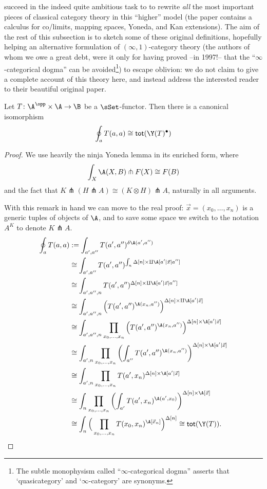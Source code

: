 \cite{cordier1997homotopy} succeed in the indeed quite ambitious task to to rewrite \emph{all} the most important pieces of classical category theory in this ``higher'' model (the paper contains a calculus for co/limits, mapping spaces, Yoneda, and Kan extensions). The aim of the rest of this subsection is to sketch some of these original definitions, hopefully helping an alternative formulation of $(\infty,1)$-category theory (the authors of whom we owe a great debt, were it only for having proved --in 1997!-- that the ``$\infty$-categorical dogma'' can be avoided\footnote{The subtle monophysism called ``$\infty$-categorical dogma'' asserts that `quasicategory' and `$\infty$\hyp{}category' are synonyms.}) to escape oblivion: we do not claim to give a complete account of this theory here, and instead address the interested reader to their beautiful original paper.
\begin{proposition}
Let $T\colon \A^\opp\times \A \to \B$ be a $\sSet$-functor. Then there is a canonical isomorphism
\[
\oint_a T(a,a) \cong \textsf{tot}(\Y(T)^\bullet)
\]
\end{proposition}
\begin{proof}
We use heavily the ninja Yoneda lemma  in its enriched form, where 
\[
\int_X \A(X,B) \pitchfork F(X) \cong F(B)
\]
and the fact that $K \pitchfork (H \pitchfork A)\cong (K\otimes H)\pitchfork A$, naturally in all arguments.

With this remark in hand we can move to the real proof: $\vec x = (x_0,\dots, x_n)$ is a generic tuples of objects of $\A$, and to save some space we switch to the notation $A^K$ to denote $K\pitchfork A$.
\begin{align*}
\oint_a T(a,a) &:= \int_{a',a''} T(a',a'')^{\delta\A(a',a'')}\\
&\cong \int_{a',a''}  		  T(a',a'')^{\int_n \Delta[n]\times \amalg \A[a'|\vec x| a'']}\\
&\cong \int_{a',a'',n}		  T(a',a'')^{\Delta[n]\times \amalg \A[a'|\vec x| a'']}\\
&\cong \int_{a',a'',n} \left( T(a',a'')^{\A(x_n,a'')} \right)^{\Delta[n]\times \amalg \A[a'|\vec x]}\\
&\cong \int_{a',a'',n} \prod_{x_0,\dots, x_n} \left( T(a',a'')^{\A(x_n,a'')} \right)^{\Delta[n]\times \A[a'|\vec x]}\\
&\cong \int_{a',n}     \prod_{x_0,\dots, x_n} \left( \int_{a''} T(a',a'')^{\A(x_n,a'')} \right)^{\Delta[n]\times \A[a'|\vec x]}\\
&\cong \int_{a',n}     \prod_{x_0,\dots, x_n} T(a',x_n)^{\Delta[n]\times \A[a'|\vec x]}\\
&\cong \int_{n}        \prod_{x_0,\dots, x_n} \left( \int_{a'} T(a',x_n)^{\A(a',x_0)} \right)^{\Delta[n]\times \A[\vec x]}\\
&\cong \int_{n}   \Big(\prod_{x_0,\dots, x_n} T(x_0,x_n)^{\A[\vec x_n]}\Big)^{\Delta[n]} \cong \textsf{tot}(\Y(T)).\qedhere
\end{align*}
\end{proof}
